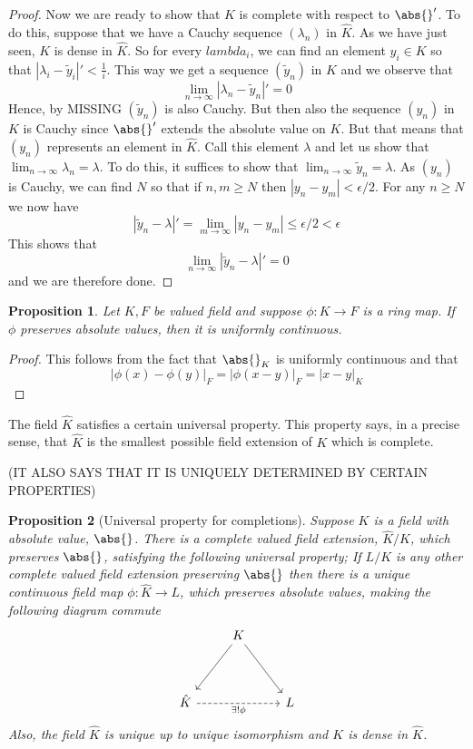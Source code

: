 \documentclass{article}
\newtheorem{proposition}{Proposition}[section]
\begin{document}
\begin{proof}
    Now we are ready to show that $\hat K$ is complete with respect to $\abs{}'$. To do this, suppose that we have a Cauchy sequence $(\lambda_n)$ in $\hat K$. As we have just seen, $K$ is dense in $\hat K$. So for every $lambda_i$, we can find an element $y_i \in K$ so that $|\lambda_i - \tilde y_i|' < \frac{1}{i}$. This way we get a sequence $(\tilde y_n)$ in $\hat K$ and we observe that
    $$\lim_{n \to \infty} |\lambda_n - \tilde y_n|' = 0$$
    Hence, by MISSING $(\tilde y_n)$ is also Cauchy. But then also the sequence $(y_n)$ in $K$ is Cauchy since $\abs{}'
    $ extends the absolute value on $K$. But that means that $(y_n)$ represents an element in $\hat K$. Call this element $\lambda$ and let us show that $\lim_{n \to \infty} \lambda_n = \lambda$. To do this, it suffices to show that $\lim_{n \to \infty} \tilde y_n = \lambda$. As $(y_n)$ is Cauchy, we can find $N$ so that if $n,m \geq N$ then $|y_n - y_m| < \epsilon / 2$. For any $n \geq N$ we now have
    $$|\tilde y_n - \lambda|' = \lim_{m \to \infty} |y_n - y_m| \leq \epsilon / 2 < \epsilon$$
    This shows that
    $$\lim_{n \to \infty} |\tilde y_n - \lambda|' = 0$$
    and we are therefore done.
\end{proof}

\begin{proposition}
    Let $K,F$ be valued field and suppose $\phi : K \to F$ is a ring map. If $\phi$ preserves absolute values, then it is uniformly continuous. 
\end{proposition}

\begin{proof}
    This follows from the fact that $\abs{}_K$ is uniformly continuous and that
    $$|\phi(x) - \phi(y)|_F = |\phi(x-y)|_F = |x-y|_K$$ 
\end{proof}

The field $\hat K$ satisfies a certain universal property. This property says, in a precise sense, that $\hat K$ is the smallest possible field extension of $K$ which is complete. 

(IT ALSO SAYS THAT IT IS UNIQUELY DETERMINED BY CERTAIN PROPERTIES)

\begin{proposition}[Universal property for completions]
    Suppose $K$ is a field with absolute value, $\abs{}$. There is a complete valued field extension, $\hat K/K$, which preserves $\abs{}$, satisfying the following universal property; If $L/K$ is any other complete valued field extension preserving $\abs{}$ then there is a unique continuous field map $\phi : \hat K \to L$, which preserves absolute values, making the following diagram commute
    \[\begin{tikzcd}
        & K \\
        \\
        \hat K && L
        \arrow["{\exists! \phi}"', dashed, from=3-1, to=3-3]
        \arrow[from=1-2, to=3-1]
        \arrow[from=1-2, to=3-3]
    \end{tikzcd}\]
    Also, the field $\hat K$ is unique up to unique isomorphism and $K$ is dense in $\hat K$.
\end{proposition}
\end{document}

